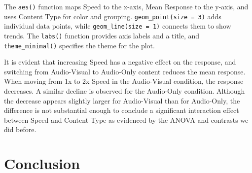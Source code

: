 \documentclass[
  letterpaper,
]{book}
\begin{document}
The \texttt{aes()} function maps Speed to the x-axis, Mean Response to
the y-axis, and uses Content Type for color and grouping.
\texttt{geom\_point(size\ =\ 3)} adds individual data points, while
\texttt{geom\_line(size\ =\ 1)} connects them to show trends. The
\texttt{labs()} function provides axis labels and a title, and
\texttt{theme\_minimal()} specifies the theme for the plot.


It is evident that increasing Speed has a negative effect on the
response, and switching from Audio-Visual to Audio-Only content reduces
the mean response. When moving from 1x to 2x Speed in the Audio-Visual
condition, the response decreases. A similar decline is observed for the
Audio-Only condition. Although the decrease appears slightly larger for
Audio-Visual than for Audio-Only, the difference is not substantial
enough to conclude a significant interaction effect between Speed and
Content Type as evidenced by the ANOVA and contrasts we did before.

\section{Conclusion}\label{conclusion}
\end{document}
